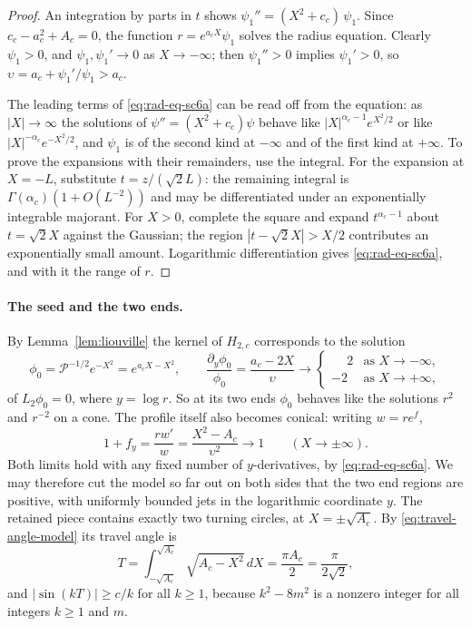 \begin{proof}
An integration by parts in $t$ shows $\psi_1''=(X^2+c_c)\,\psi_1$.
Since $c_c-a_c^2+A_c=0$, the function $r=e^{a_cX}\psi_1$ solves the
radius equation. Clearly $\psi_1>0$, and $\psi_1,\psi_1'\to0$ as
$X\to-\infty$; then $\psi_1''>0$ implies $\psi_1'>0$, so
$\upsilon=a_c+\psi_1'/\psi_1>a_c$.

The leading terms of \eqref{eq:rad-eq-sc6a} can be read off from the
equation: as $|X|\to\infty$ the solutions of
$\psi''=(X^2+c_c)\psi$ behave like $|X|^{\alpha_c-1}e^{X^2/2}$ or like
$|X|^{-\alpha_c}e^{-X^2/2}$, and $\psi_1$ is of the second kind at
$-\infty$ and of the first kind at $+\infty$. To prove the expansions
with their remainders, use the integral.
For the expansion at $X=-L$, substitute $t=z/(\sqrt2L)$: the remaining
integral is $\Gamma(\alpha_c)(1+O(L^{-2}))$ and may be differentiated
under an exponentially integrable majorant. For $X>0$, complete the
square and expand $t^{\alpha_c-1}$ about $t=\sqrt2X$ against the
Gaussian; the region $|t-\sqrt2X|>X/2$ contributes an exponentially
small amount. Logarithmic differentiation gives
\eqref{eq:rad-eq-sc6a}, and with it the range of $r$.
\end{proof}

\paragraph{The seed and the two ends.}
By Lemma~\ref{lem:liouville} the kernel of $H_{2,c}$ corresponds to
the solution
\begin{equation}\label{eq:rad-eq-sc2}
 \phi_0=\mathcal P^{-1/2}e^{-X^2}=e^{a_cX-X^2},\qquad
 \frac{\partial_y\phi_0}{\phi_0}=\frac{a_c-2X}{\upsilon}
 \longrightarrow
 \begin{cases}\phantom{-}2&\text{as }X\to-\infty,\\
              -2&\text{as }X\to+\infty,\end{cases}
\end{equation}
of $L_2\phi_0=0$, where $y=\log r$. So at its two ends $\phi_0$
behaves like the solutions $r^{2}$ and $r^{-2}$ on a cone. The profile
itself also becomes conical: writing $w=re^f$,
\begin{equation}\label{eq:rad-eq-sc6b}
 1+f_y=\frac{rw'}{w}=\frac{X^2-A_c}{\upsilon^2}\longrightarrow1
 \qquad(X\to\pm\infty).
\end{equation}
Both limits hold with any fixed number of $y$-derivatives, by
\eqref{eq:rad-eq-sc6a}. We may therefore cut the model so far out on
both sides that the two end regions are positive, with uniformly
bounded jets in the logarithmic coordinate $y$. The retained piece
contains exactly two turning circles, at $X=\pm\sqrt{A_c}$. By
\eqref{eq:travel-angle-model} its travel angle is
\[
 T=\int_{-\sqrt{A_c}}^{\sqrt{A_c}}\sqrt{A_c-X^2}\,dX
  =\frac{\pi A_c}2=\frac{\pi}{2\sqrt2},
\]
and $|\sin(kT)|\ge c/k$ for all $k\ge1$, because $k^2-8m^2$ is a
nonzero integer for all integers $k\ge1$ and $m$.

